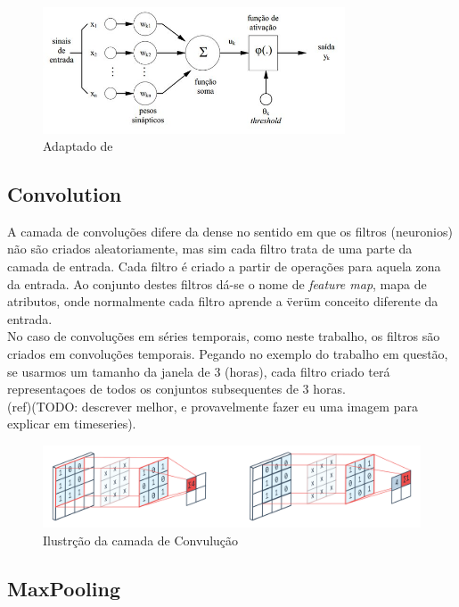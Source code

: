 \begin{figure}[H]
	\centering
	\includegraphics[width=0.8\textwidth]{Imagens/percepton.png}
	\caption[Ilustração da camada de Dense.]{Adaptado de \cite{Haykin1999}}
	\label{fig:dense}
\end{figure}


\subsection{Convolution\label{se:conv_layer}}

A camada de convoluções difere da dense no sentido em que os filtros (neuronios) não são criados aleatoriamente, mas sim cada filtro trata de uma parte da camada de entrada.
Cada filtro é criado a partir de operações para aquela zona da entrada. Ao conjunto destes filtros dá-se o nome de \textit{feature map}, mapa de atributos, onde normalmente cada filtro aprende a \"ver\" um conceito diferente da entrada. \\
No caso de convoluções em séries temporais, como neste trabalho, os filtros são criados em convoluções temporais\cite{sss}. Pegando no exemplo do trabalho em questão, se usarmos um tamanho da janela de 3 (horas), cada filtro criado terá representaçoes de todos os conjuntos subsequentes de 3 horas. \\
(ref)(TODO: descrever melhor, e provavelmente fazer eu uma imagem para explicar em timeseries).

\begin{figure}[H]
	\centering
	\includegraphics{Imagens/conv_layer.png}
	\caption{Ilustrção da camada de Convulução}
	\label{fig:conv_blcok}
\end{figure}


\subsection{MaxPooling\label{se:max_pooling}}

